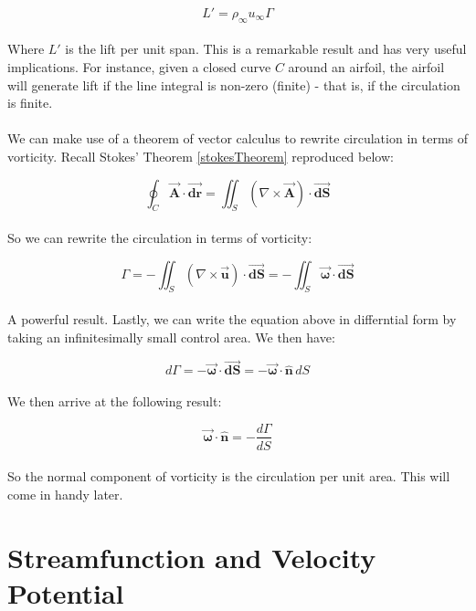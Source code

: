 \documentclass[11pt]{article}
\begin{document}
\begin{equation*}
    L' = \rho_\infty u_\infty \Gamma
\end{equation*}\\
\noindent
Where $L'$ is the lift per unit span. This is a remarkable result and has very useful implications. For instance, given a closed curve $C$ around an airfoil, the airfoil will generate lift if the line integral is non-zero (finite) - that is, if the circulation is finite. \\ \\
\noindent
We can make use of a theorem of vector calculus to rewrite circulation in terms of vorticity. Recall Stokes' Theorem \eqref{stokesTheorem} reproduced below:

\begin{equation*}
    \oint_C \vec{\bm{A}} \cdot \vec{\bm{dr}} = \iint_S (\nabla \times \vec{\bm{A}}) \cdot \vec{\bm{dS}}
\end{equation*} \\
\noindent
So we can rewrite the circulation in terms of vorticity:

\begin{equation*}
    \Gamma = -\iint_S (\nabla \times \vec{\bm{u}}) \cdot \vec{\bm{dS}} = -\iint_S \vec{\bm{\omega}} \cdot \vec{\bm{dS}}
\end{equation*} \\
\noindent
A powerful result. Lastly, we can write the equation above in differntial form by taking an infinitesimally small control area. We then have:

\begin{equation*}
    d\Gamma = -\vec{\bm{\omega}}\cdot\vec{\bm{dS}} = -\vec{\bm{\omega}}\cdot\hat{\bm{n}}\,dS
\end{equation*} \\
We then arrive at the following result:

\begin{equation*}
    \vec{\bm{\omega}}\cdot\hat{\bm{n}} = -\frac{d\Gamma}{dS}
\end{equation*} \\
\noindent
So the normal component of vorticity is the circulation per unit area. This will come in handy later.
\pagebreak

\section{Streamfunction and Velocity Potential}
\end{document}
